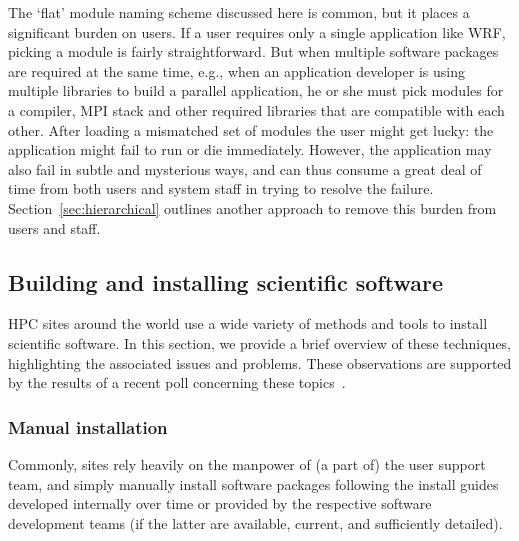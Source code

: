 The `flat' module naming scheme discussed here is common, but it places a significant
burden on users. If a user requires only a single application like WRF, picking a
module is fairly straightforward. But when multiple software packages are required
at the same time, e.g., when an application developer is using multiple libraries to
build a parallel application, he or she must pick modules for a
compiler, MPI stack and other required libraries that are compatible with each other.
After loading a mismatched set of modules the user might get lucky: the application might fail to run or die immediately.  However, the
application may also fail in subtle and mysterious ways, and can thus consume a
great deal of time from both users and system staff in trying to resolve the failure.
Section~\ref{sec:hierarchical} outlines another approach to remove this burden
from users and staff.


%
%


\subsection{Building and installing scientific software}
\label{sec:installing}

HPC sites around the world use a wide variety of methods and tools to
install scientific software. In this section, we provide a brief
overview of these techniques,
highlighting the associated issues and problems. These observations are
supported by the results of a recent poll concerning these
topics~\cite{ISC14bof}.

\subsubsection{Manual installation}

Commonly, sites rely heavily on the manpower of (a part of)
the user support team, and simply manually install software packages following
the install guides developed internally over time or provided
by the respective software development teams (if the latter are available, current, and
sufficiently detailed).

